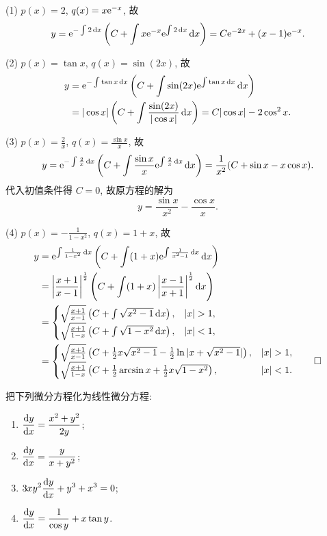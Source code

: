 \begin{solution}
  (1) $p(x)=2$, $q(x)=x\mathrm{e}^{-x}$, 故
  \[y = \mathrm{e}^{-\int2\mathop{}\!\mathrm{d} x}\left(C+\int x\mathrm{e}^{-x}\mathrm{e}^{\int2\mathop{}\!\mathrm{d} x}\mathop{}\!\mathrm{d} x\right)
      = C\mathrm{e}^{-2x}+(x-1)\mathrm{e}^{-x}.\]

  (2) $p(x)=\tan x$, $q(x)=\sin(2x)$, 故
  \[\begin{split}
    y & = \mathrm{e}^{-\int\tan x\mathop{}\!\mathrm{d} x}\left(C+\int\sin(2x)\mathrm{e}^{\int\tan x\mathop{}\!\mathrm{d} x}\mathop{}\!\mathrm{d} x\right)\\
      & = |\cos x|\left(C+\int\frac{\sin(2x)}{|\cos x|}\mathop{}\!\mathrm{d} x\right)=C|\cos x|-2\cos^2x.
  \end{split}\]

  (3) $p(x)=\frac{2}{x}$, $q(x)=\frac{\sin x}{x}$, 故
  \[y = \mathrm{e}^{-\int\frac{2}{x}\mathop{}\!\mathrm{d} x}\left(C+\int\frac{\sin x}{x}
    \mathrm{e}^{\int\frac{2}{x}\mathop{}\!\mathrm{d} x}\mathop{}\!\mathrm{d} x\right) = \frac{1}{x^2}(C+\sin x-x\cos x).\]
  代入初值条件得 $C=0$, 故原方程的解为
  \[y=\frac{\sin x}{x^2}-\frac{\cos x}{x}.\]

  (4) $p(x) = -\frac{1}{1-x^2}$, $q(x)=1+x$, 故
  \begin{align*}
    y
    & = \e^{\int\frac{1}{1-x^2}\diff x}\left(C+\int(1+x)\e^{\int\frac{1}{x^2-1}\diff x}\diff x\right) \\
    & = \left|\frac{x+1}{x-1}\right|^{\frac{1}{2}}\left(C+\int(1+x)\left|\frac{x-1}{x+1}\right|^{\frac{1}{2}}\diff x\right)\\
    & = \begin{cases}
      \sqrt{\frac{x+1}{x-1}}\left(C+\int\sqrt{x^2-1}\diff x\right), & |x|>1, \\
      \sqrt{\frac{x+1}{1-x}}\left(C+\int\sqrt{1-x^2}\diff x\right), & |x|<1,
    \end{cases} \\
    & = \begin{cases}
      \sqrt{\frac{x+1}{x-1}}\left(C+\frac{1}{2}x\sqrt{x^2-1}-\frac{1}{2}\ln|x+\sqrt{x^2-1}|\right),
        & |x|>1, \\
        \sqrt{\frac{x+1}{1-x}}\left(C+\frac{1}{2}\arcsin x+\frac{1}{2}x\sqrt{1-x^2}\right),
        & |x|<1.
    \end{cases}\qedhere
  \end{align*}
\end{solution}



\begin{exercise}
  把下列微分方程化为线性微分方程:
  \begin{enumerate}[(1)]
  \item $\displaystyle\frac{\mathop{}\!\mathrm{d} y}{\mathop{}\!\mathrm{d} x}=\frac{x^2+y^2}{2y}$;
  \item $\displaystyle\frac{\mathop{}\!\mathrm{d} y}{\mathop{}\!\mathrm{d} x}=\frac{y}{x+y^2}$;
  \item $\displaystyle 3xy^2\frac{\mathop{}\!\mathrm{d} y}{\mathop{}\!\mathrm{d} x}+y^3+x^3=0$;
  \item $\displaystyle\frac{\mathop{}\!\mathrm{d} y}{\mathop{}\!\mathrm{d} x}=\frac{1}{\cos y}+x\tan y$.
  \end{enumerate}
\end{exercise}

